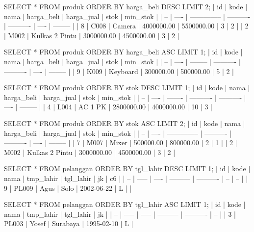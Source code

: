 SELECT * FROM produk ORDER BY harga_beli DESC LIMIT 2;
| id | kode | nama           | harga_beli | harga_jual | stok | min_stok |
| -- | ---- | -------------- | ---------- | ---------- | ---- | -------- |
| 8  | C008 | Camera         | 4000000.00 | 5500000.00 | 3    | 2        |
| 2  | M002 | Kulkas 2 Pintu | 3000000.00 | 4500000.00 | 3    | 2        |

SELECT * FROM produk ORDER BY harga_beli ASC LIMIT 1;
| id | kode | nama     | harga_beli | harga_jual | stok | min_stok |
| -- | ---- | -------- | ---------- | ---------- | ---- | -------- |
| 9  | K009 | Keyboard | 300000.00  | 500000.00  | 5    | 2        |

SELECT * FROM produk ORDER BY stok DESC LIMIT 1;
| id | kode | nama    | harga_beli | harga_jual | stok | min_stok |
| -- | ---- | ------- | ---------- | ---------- | ---- | -------- |
| 4  | L004 | AC 1 PK | 2800000.00 | 4000000.00 | 10   | 3        |

SELECT * FROM produk ORDER BY stok ASC LIMIT 2;
| id | kode | nama           | harga_beli | harga_jual | stok | min_stok |
| -- | ---- | -------------- | ---------- | ---------- | ---- | -------- |
| 7  | M007 | Mixer          | 500000.00  | 800000.00  | 2    | 1        |
| 2  | M002 | Kulkas 2 Pintu | 3000000.00 | 4500000.00 | 3    | 2        |

SELECT * FROM pelanggan ORDER BY tgl_lahir DESC LIMIT 1;
| id | kode  | nama | tmp_lahir | tgl_lahir  | jk | c6 |
| -- | ----- | ---- | --------- | ---------- | -- | -- |
| 9  | PL009 | Agus | Solo      | 2002-06-22 | L  |    |

SELECT * FROM pelanggan ORDER BY tgl_lahir ASC LIMIT 1;
| id | kode  | nama  | tmp_lahir | tgl_lahir  | jk |
| -- | ----- | ----- | --------- | ---------- | -- |
| 3  | PL003 | Yosef | Surabaya  | 1995-02-10 | L  |
